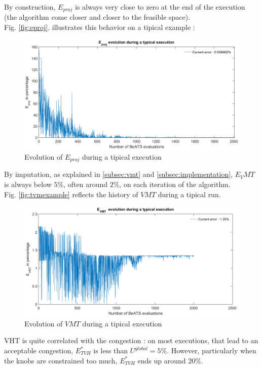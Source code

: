 By construction, $E_{proj}$ is always very close to zero at the end of the execution (the algorithm come closer and closer to the feasible space).\\
Fig. \ref{fig:eproj}. illustrates this behavior on a tipical example : 
\begin{figure}[h]
	\label{fig:eprojexample}
	\caption{Evolution of $E_{proj}$ during a tipical execution}
	\includegraphics[width=7in]{figures/results_figures/eprojexample.png}
\end{figure}	
By imputation, as explained in \ref{subsec:vmt} and \ref{subsec:implementation}, $E_VMT$ is always below $5\%$, often around $2\%$, on each iteration of the algorithm.\\
Fig. \ref{fig:tvmexample} reflects the history of $VMT$ during a tipical run.
\begin{figure}[h]
	\label{fig:vmtexample}
	\caption{Evolution of $VMT$ during a tipical execution}
	\includegraphics[width=7in]{figures/results_figures/vmtexample.png}
\end{figure}	
VHT is quite correlated with the congestion : on most executions, that lead to an acceptable congestion, $E_{TVH}^{*}$ is less than $U^{global}=5\%$. However, particularly when the knobs are constrained too much,  $E_{TVH}^{*}$ ends up around $20\%$.
